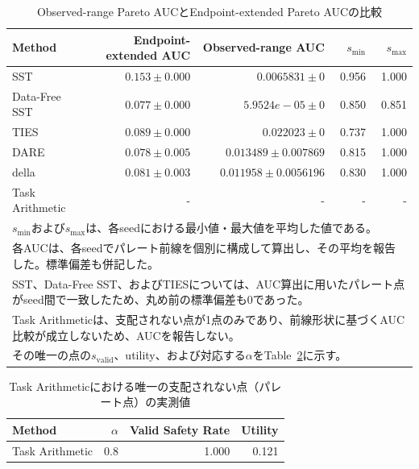 \documentclass{article}
\begin{document}
\begin{table}[H]
\centering
\caption{Observed-range Pareto AUCとEndpoint-extended Pareto AUCの比較}
\label{tab:auc_no_interpolation}
\small
\begin{tabular}{lrrrr}
\toprule
Method & Endpoint-extended AUC & Observed-range AUC & \(s_{\min}\) & \(s_{\max}\) \\
\midrule
SST & $0.153 \pm 0.000$ & $0.0065831 \pm 0$ & 0.956 & 1.000 \\
Data-Free SST & $0.077 \pm 0.000$ & $5.9524e-05 \pm 0$ & 0.850 & 0.851 \\
TIES & $0.089 \pm 0.000$ & $0.022023 \pm 0$ & 0.737 & 1.000 \\
DARE & $0.078 \pm 0.005$ & $0.013489 \pm 0.007869$ & 0.815 & 1.000 \\
della & $0.081 \pm 0.003$ & $0.011958 \pm 0.0056196$ & 0.830 & 1.000 \\
Task Arithmetic & - & - & - & - \\
\bottomrule
\multicolumn{5}{l}{\footnotesize \(s_{\min}\)および\(s_{\max}\)は、各seedにおける最小値・最大値を平均した値である。} \\
\multicolumn{5}{l}{\footnotesize 各AUCは、各seedでパレート前線を個別に構成して算出し、その平均を報告した。標準偏差も併記した。} \\
\multicolumn{5}{l}{\footnotesize SST、Data-Free SST、およびTIESについては、AUC算出に用いたパレート点がseed間で一致したため、丸め前の標準偏差も0であった。} \\
\multicolumn{5}{l}{\footnotesize Task Arithmeticは、支配されない点が1点のみであり、前線形状に基づくAUC比較が成立しないため、AUCを報告しない。} \\
\multicolumn{5}{l}{\footnotesize その唯一の点の\(s_{\mathrm{valid}}\)、utility、および対応する\(\alpha\)をTable~\ref{tab:task-arithmetic-single-point}に示す。} \\
\end{tabular}
\end{table}

\begin{table}[H]
\centering
\caption{Task Arithmeticにおける唯一の支配されない点（パレート点）の実測値}
\label{tab:task-arithmetic-single-point}
\small
\begin{tabular}{lrrr}
\toprule
Method & \(\alpha\) & Valid Safety Rate & Utility \\
\midrule
Task Arithmetic & 0.8 & 1.000 & 0.121 \\
\bottomrule
\end{tabular}
\end{table}
\end{document}
